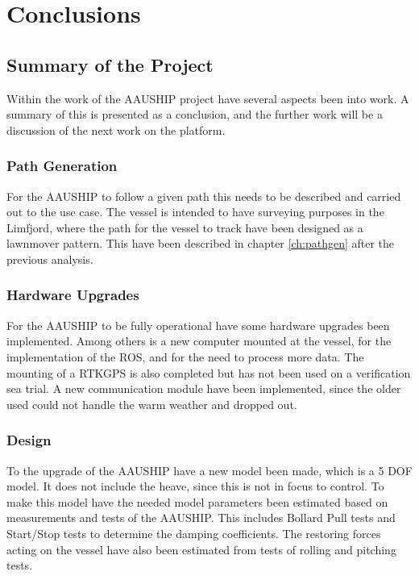 \chapter{Conclusions}
\label{sc:FW}

\section{Summary of the Project}
Within the work of the AAUSHIP project have several aspects been into work. A summary of this is presented as a conclusion, and the further work will be a discussion of the next work on the platform.

\subsection{Path Generation}
For the AAUSHIP to follow a given path this needs to be described and carried out to the use case. The vessel is intended to have surveying purposes in the Limfjord, where the path for the vessel to track have been designed as a lawnmover pattern. This have been described in chapter \ref{ch:pathgen} after the previous analysis.

\subsection{Hardware Upgrades}
For the AAUSHIP to be fully operational have some hardware upgrades been implemented. Among others is a new computer mounted at the vessel, for the implementation of the \ac{ROS}, and for the need to process more data. The mounting of a \ac{RTK}\ac{GPS} is also completed but has not been used on a verification sea trial. A new communication module have been implemented, since the older used could not handle the warm weather and dropped out.

\subsection{Design}
To the upgrade of the AAUSHIP have a new model been made, which is a 5 \ac{DOF} model. It does not include the heave, since this is not in focus to control. To make this model have the needed model parameters been estimated based on measurements and tests of the AAUSHIP. This includes Bollard Pull tests and Start/Stop tests to determine the damping coefficients. The restoring forces acting on the vessel have also been estimated from tests of rolling and pitching tests.

